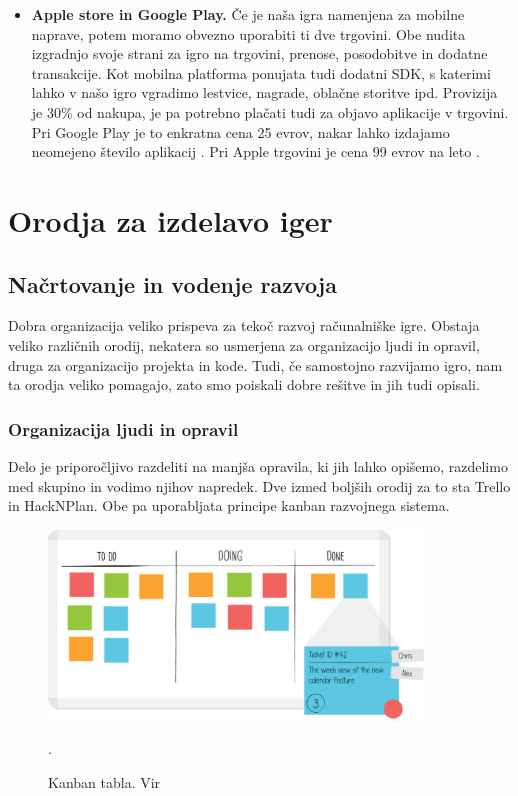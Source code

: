 \documentclass[12pt,a4paper,twoside]{book}
\begin{document}
\begin{itemize}
	\item \textbf{Apple store in Google Play.} Če je naša igra namenjena za mobilne naprave, potem moramo obvezno uporabiti ti dve trgovini. Obe nudita izgradnjo svoje strani za igro na trgovini, prenose, posodobitve in dodatne transakcije. Kot mobilna platforma ponujata tudi dodatni SDK, s katerimi lahko v našo igro vgradimo lestvice, nagrade, oblačne storitve ipd. Provizija je 30\% od nakupa, je pa potrebno plačati tudi za objavo aplikacije v trgovini. Pri Google Play je to enkratna cena 25 evrov, nakar lahko izdajamo neomejeno število aplikacij \cite{googleplay}. Pri Apple trgovini je cena 99 evrov na leto \cite{applestore}.
\end{itemize} 

\chapter{Orodja za izdelavo iger}\thispagestyle{fancy}
\section{Načrtovanje in vodenje razvoja}
Dobra organizacija veliko prispeva za tekoč razvoj računalniške igre. Obstaja veliko različnih orodij, nekatera so usmerjena za organizacijo ljudi in opravil, druga za organizacijo projekta in kode. Tudi, če samostojno razvijamo igro, nam ta orodja veliko pomagajo, zato smo poiskali dobre rešitve in jih tudi opisali.

\subsection{Organizacija ljudi in opravil}
Delo je priporočljivo razdeliti na manjša opravila, ki jih lahko opišemo, razdelimo med skupino in vodimo njihov napredek. Dve izmed boljših orodij za to sta Trello in HackNPlan. Obe pa uporabljata principe kanban razvojnega sistema.

\begin{figure}[h]
	\centering
	\includegraphics[width=10cm]{kanban_guide_print_KPO_bleed_board2}
	\caption{Kanban tabla. Vir \cite{kanbanBoard}}.
	\label{slika:kanbanBoard}
	\vspace*{-2em}
\end{figure}
\end{document}
